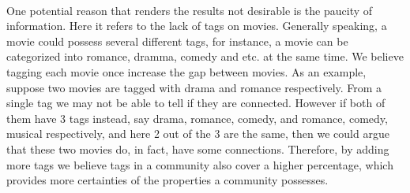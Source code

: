 \paragraph{}
One potential reason that renders the results not desirable is the paucity of information. Here it refers to the lack of tags on movies. Generally speaking, a movie could possess several different tags, for instance, a movie can be categorized into romance, dramma, comedy and etc. at the same time. We believe tagging each movie once increase the gap between movies. As an example, suppose two movies are tagged with drama and romance respectively. From a single tag we may not be able to tell if they are connected. However if both of them have 3 tags instead, say drama, romance, comedy, and romance, comedy, musical respectively, and here 2 out of the 3 are the same, then we could argue that these two movies do, in fact, have some connections. Therefore, by adding more tags we believe tags in a community also cover a higher percentage, which provides more certainties of the properties a community possesses.